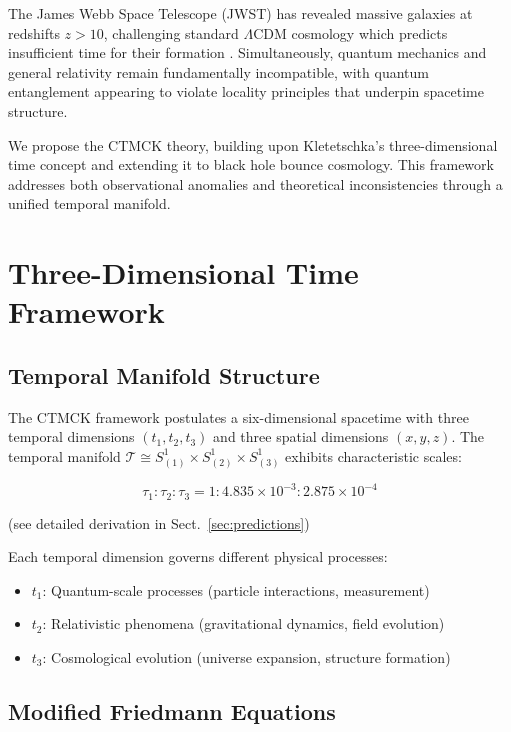 \documentclass[reprint,amsmath,amssymb,aps,prd,nofootinbib]{revtex4-2}
\begin{document}
The James Webb Space Telescope (JWST) has revealed massive galaxies at redshifts $z > 10$, challenging standard $\Lambda$CDM cosmology which predicts insufficient time for their formation \cite{Naidu2022,Boylan-Kolchin2023}. Simultaneously, quantum mechanics and general relativity remain fundamentally incompatible, with quantum entanglement appearing to violate locality principles that underpin spacetime structure.

We propose the CTMCK theory, building upon Kletetschka's three-dimensional time concept \cite{Kletetschka2021} and extending it to black hole bounce cosmology. This framework addresses both observational anomalies and theoretical inconsistencies through a unified temporal manifold.

\section{Three-Dimensional Time Framework}\label{sec:framework}

\subsection{Temporal Manifold Structure}

The CTMCK framework postulates a six-dimensional spacetime with three temporal dimensions $(t_1,t_2,t_3)$ and three spatial dimensions $(x,y,z)$. The temporal manifold $\mathcal{T} \cong S^1_{(1)}\times S^1_{(2)}\times S^1_{(3)}$ exhibits characteristic scales:

\begin{equation}
\tau_1:\tau_2:\tau_3 = 1:4.835\times10^{-3}:2.875\times10^{-4}
\label{eq:temporal_scales}
\end{equation}

(see detailed derivation in Sect.~\ref{sec:predictions})

Each temporal dimension governs different physical processes:
\begin{itemize}
\item $t_1$: Quantum-scale processes (particle interactions, measurement)
\item $t_2$: Relativistic phenomena (gravitational dynamics, field evolution)  
\item $t_3$: Cosmological evolution (universe expansion, structure formation)
\end{itemize}

\subsection{Modified Friedmann Equations}
\end{document}
